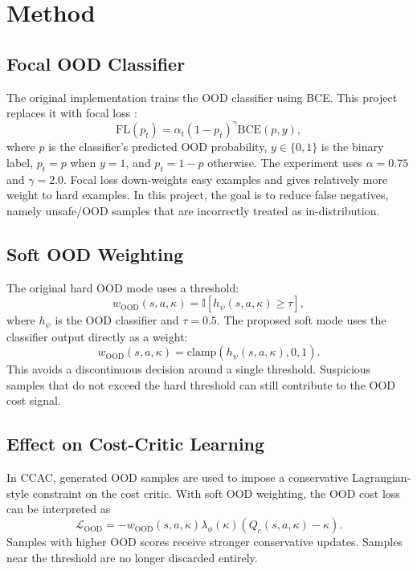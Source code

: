 \documentclass[11pt,a4paper]{article}
\newcommand{\ccac}{\textsc{CCAC}}
\newcommand{\ood}{\mathrm{OOD}}
\newcommand{\qc}{Q_c}
\begin{document}
\section{Method}

\subsection{Focal OOD Classifier}

The original implementation trains the OOD classifier using BCE. This project
replaces it with focal loss \cite{lin2017focal}:
\begin{equation}
  \mathrm{FL}(p_t)
  =
  \alpha_t (1-p_t)^\gamma \mathrm{BCE}(p,y),
  \label{eq:focal}
\end{equation}
where \(p\) is the classifier's predicted OOD probability, \(y\in\{0,1\}\) is
the binary label, \(p_t=p\) when \(y=1\), and \(p_t=1-p\) otherwise. The
experiment uses \(\alpha=0.75\) and \(\gamma=2.0\). Focal loss down-weights
easy examples and gives relatively more weight to hard examples. In this
project, the goal is to reduce false negatives, namely unsafe/OOD samples that
are incorrectly treated as in-distribution.

\subsection{Soft OOD Weighting}

The original hard OOD mode uses a threshold:
\begin{equation}
  w_{\ood}(s,a,\kappa)
  =
  \mathbb{I}\left[h_\psi(s,a,\kappa) \ge \tau\right],
  \label{eq:hard-ood}
\end{equation}
where \(h_\psi\) is the OOD classifier and \(\tau=0.5\). The proposed soft mode
uses the classifier output directly as a weight:
\begin{equation}
  w_{\ood}(s,a,\kappa)
  =
  \mathrm{clamp}\left(h_\psi(s,a,\kappa),0,1\right).
  \label{eq:soft-ood}
\end{equation}
This avoids a discontinuous decision around a single threshold. Suspicious
samples that do not exceed the hard threshold can still contribute to the OOD
cost signal.

\subsection{Effect on Cost-Critic Learning}

In \ccac{}, generated OOD samples are used to impose a conservative
Lagrangian-style constraint on the cost critic. With soft OOD weighting, the
OOD cost loss can be interpreted as
\begin{equation}
  \mathcal{L}_{\ood}
  =
  - w_{\ood}(s,a,\kappa)\lambda_\phi(\kappa)
  \left(\qc(s,a,\kappa)-\kappa\right).
  \label{eq:ood-cost-loss}
\end{equation}
Samples with higher OOD scores receive stronger conservative updates. Samples
near the threshold are no longer discarded entirely.
\end{document}
